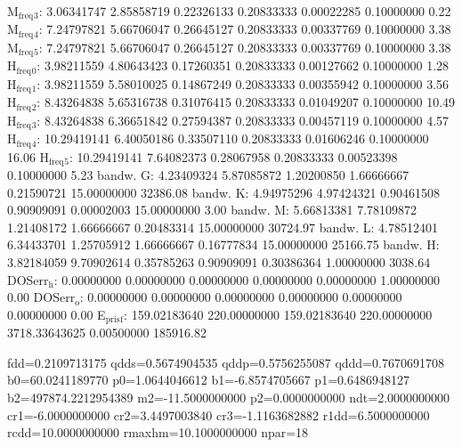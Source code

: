 \documentclass[11pt]{article}
\begin{document}
M\(_{\text{freq}}\)\(_{\text{3}}\):   3.06341747   2.85858719   0.22326133   0.20833333   0.00022285   0.10000000         0.22
M\(_{\text{freq}}\)\(_{\text{4}}\):   7.24797821   5.66706047   0.26645127   0.20833333   0.00337769   0.10000000         3.38
M\(_{\text{freq}}\)\(_{\text{5}}\):   7.24797821   5.66706047   0.26645127   0.20833333   0.00337769   0.10000000         3.38
H\(_{\text{freq}}\)\(_{\text{0}}\):   3.98211559   4.80643423   0.17260351   0.20833333   0.00127662   0.10000000         1.28
H\(_{\text{freq}}\)\(_{\text{1}}\):   3.98211559   5.58010025   0.14867249   0.20833333   0.00355942   0.10000000         3.56
H\(_{\text{freq}}\)\(_{\text{2}}\):   8.43264838   5.65316738   0.31076415   0.20833333   0.01049207   0.10000000        10.49
H\(_{\text{freq}}\)\(_{\text{3}}\):   8.43264838   6.36651842   0.27594387   0.20833333   0.00457119   0.10000000         4.57
H\(_{\text{freq}}\)\(_{\text{4}}\):  10.29419141   6.40050186   0.33507110   0.20833333   0.01606246   0.10000000        16.06
H\(_{\text{freq}}\)\(_{\text{5}}\):  10.29419141   7.64082373   0.28067958   0.20833333   0.00523398   0.10000000         5.23
bandw. G:   4.23409324   5.87085872   1.20200850   1.66666667   0.21590721  15.00000000     32386.08
bandw. K:   4.94975296   4.97424321   0.90461508   0.90909091   0.00002003  15.00000000         3.00
bandw. M:   5.66813381   7.78109872   1.21408172   1.66666667   0.20483314  15.00000000     30724.97
bandw. L:   4.78512401   6.34433701   1.25705912   1.66666667   0.16777834  15.00000000     25166.75
bandw. H:   3.82184059   9.70902614   0.35785263   0.90909091   0.30386364   1.00000000      3038.64
DOSerr\(_{\text{h}}\):   0.00000000   0.00000000   0.00000000   0.00000000   0.00000000   1.00000000         0.00
DOSerr\(_{\text{o}}\):   0.00000000   0.00000000   0.00000000   0.00000000   0.00000000   0.00000000         0.00
E\(_{\text{pris}}\)\(_{\text{f}}\): 159.02183640 220.00000000 159.02183640 220.00000000 3718.33643625   0.00500000    185916.82


fdd=0.2109713175 qdds=0.5674904535 qddp=0.5756255087 qddd=0.7670691708 b0=60.0241189770 p0=1.0644046612 b1=-6.8574705667 p1=0.6486948127 b2=497874.2212954389 m2=-11.5000000000 p2=0.0000000000 ndt=2.0000000000 cr1=-6.0000000000 cr2=3.4497003840 cr3=-1.1163682882 r1dd=6.5000000000 rcdd=10.0000000000 rmaxhm=10.1000000000 npar=18
\end{document}
